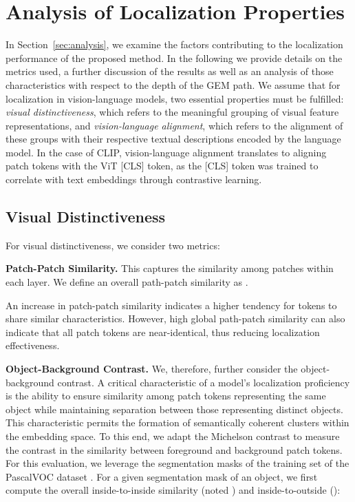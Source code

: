 \documentclass[10pt,twocolumn,letterpaper]{article}
\begin{document}
\section{Analysis of Localization Properties}\label{appendix:loc_prop_analysis}

In Section~\ref{sec:analysis}, we examine the factors contributing to the localization performance of the proposed method. In the following we provide details on the metrics used, a further discussion of the results as well as an analysis of those characteristics with respect to the depth of the GEM path. 
We assume that for localization in vision-language models, two essential properties must be fulfilled: \textit{visual distinctiveness}, which refers to the meaningful grouping of visual feature representations, and \textit{vision-language alignment}, which refers to the alignment of these groups with their respective textual descriptions encoded by the language model. In the case of CLIP, vision-language alignment translates to aligning patch tokens with the ViT [CLS] token, as the [CLS] token was trained to correlate with text embeddings through contrastive learning.

\subsection{Visual Distinctiveness} 
For visual distinctiveness, we consider two metrics:

\noindent \textbf{Patch-Patch Similarity.}
This captures the similarity among patches within each layer.  
We define an overall path-patch similarity as .

An increase in patch-patch similarity indicates a higher tendency for tokens to share similar characteristics.
However, high global path-patch similarity can also indicate that all patch tokens are near-identical, thus reducing localization effectiveness.






\noindent \textbf{Object-Background Contrast.}
We, therefore, further consider the object-background contrast. 
A critical characteristic of a model's localization proficiency is the ability to ensure similarity among patch tokens representing the same object while maintaining separation between those representing distinct objects. 
This characteristic permits the formation of semantically coherent clusters within the embedding space.
To this end, we adapt the Michelson contrast to measure the contrast in the similarity between foreground and background patch tokens. For this evaluation, we leverage the segmentation masks of the training set of the PascalVOC dataset \citep{everingham2010pascal}.
For a given segmentation mask  of an object, we first compute the overall inside-to-inside similarity (noted ) and inside-to-outside (): 
\end{document}
